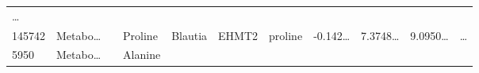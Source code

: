 \documentclass[
]{article}
\begin{document}
\begin{longtable}[]{@{}lllllllllll@{}}
\begin{minipage}[t]{0.03\columnwidth}
\ldots{}\strut
\end{minipage}\tabularnewline
\begin{minipage}[t]{0.05\columnwidth}\raggedright
145742\strut
\end{minipage} & \begin{minipage}[t]{0.07\columnwidth}\raggedright
Metabo\ldots{}\strut
\end{minipage} & \begin{minipage}[t]{0.07\columnwidth}\raggedright
\strut
\end{minipage} & \begin{minipage}[t]{0.09\columnwidth}\raggedright
Proline\strut
\end{minipage} & \begin{minipage}[t]{0.07\columnwidth}\raggedright
Blautia\strut
\end{minipage} & \begin{minipage}[t]{0.07\columnwidth}\raggedright
EHMT2\strut
\end{minipage} & \begin{minipage}[t]{0.09\columnwidth}\raggedright
proline\strut
\end{minipage} & \begin{minipage}[t]{0.07\columnwidth}\raggedright
-0.142\ldots{}\strut
\end{minipage} & \begin{minipage}[t]{0.07\columnwidth}\raggedright
7.3748\ldots{}\strut
\end{minipage} & \begin{minipage}[t]{0.07\columnwidth}\raggedright
9.0950\ldots{}\strut
\end{minipage} & \begin{minipage}[t]{0.03\columnwidth}\raggedright
\ldots{}\strut
\end{minipage}\tabularnewline
\begin{minipage}[t]{0.05\columnwidth}\raggedright
5950\strut
\end{minipage} & \begin{minipage}[t]{0.07\columnwidth}\raggedright
Metabo\ldots{}\strut
\end{minipage} & \begin{minipage}[t]{0.07\columnwidth}\raggedright
\strut
\end{minipage} & \begin{minipage}[t]{0.09\columnwidth}\raggedright
Alanine\strut
\end{minipage} & \begin{minipage}[t]{0.07\columnwidth}\raggedright

\end{minipage}
\end{longtable}
\end{document}

